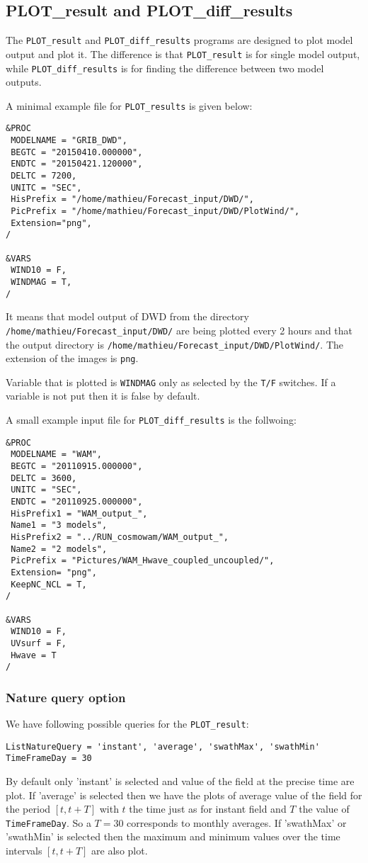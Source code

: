 \documentclass[12pt]{amsart}
\begin{document}
\subsection{PLOT\_result and PLOT\_diff\_results}

The {\tt PLOT\_result} and {\tt PLOT\_diff\_results} programs are designed to plot model output and plot it. The difference is that {\tt PLOT\_result} is for single model output, while {\tt PLOT\_diff\_results} is for finding the difference between two model outputs.

A minimal example file for {\tt PLOT\_results} is given below:
\begin{verbatim}
&PROC
 MODELNAME = "GRIB_DWD", 
 BEGTC = "20150410.000000",
 ENDTC = "20150421.120000",
 DELTC = 7200, 
 UNITC = "SEC", 
 HisPrefix = "/home/mathieu/Forecast_input/DWD/", 
 PicPrefix = "/home/mathieu/Forecast_input/DWD/PlotWind/", 
 Extension="png",
/

&VARS
 WIND10 = F, 
 WINDMAG = T, 
/
\end{verbatim}
It means that model output of DWD from the directory {\tt /home/mathieu/Forecast\_input/DWD/} are being plotted every 2 hours and that the output directory is {\tt /home/mathieu/Forecast\_input/DWD/PlotWind/}. The extension of the images is {\tt png}.

Variable that is plotted is {\tt WINDMAG} only as selected by the {\tt T/F} switches. If a variable is not put then it is false by default.

A small example input file for {\tt PLOT\_diff\_results} is the follwoing:
\begin{verbatim}
&PROC
 MODELNAME = "WAM", 
 BEGTC = "20110915.000000", 
 DELTC = 3600, 
 UNITC = "SEC", 
 ENDTC = "20110925.000000", 
 HisPrefix1 = "WAM_output_", 
 Name1 = "3 models",
 HisPrefix2 = "../RUN_cosmowam/WAM_output_", 
 Name2 = "2 models",
 PicPrefix = "Pictures/WAM_Hwave_coupled_uncoupled/",
 Extension= "png",
 KeepNC_NCL = T,
/

&VARS
 WIND10 = F, 
 UVsurf = F, 
 Hwave = T
/
\end{verbatim}


\subsubsection{Nature query option}
We have following possible queries for the {\tt PLOT\_result}:
\begin{verbatim}
ListNatureQuery = 'instant', 'average', 'swathMax', 'swathMin'
TimeFrameDay = 30
\end{verbatim}
By default only 'instant' is selected and value of the field at the precise time are plot.
If 'average' is selected then we have the plots of average value of the field for the period $[t, t+ T]$ with $t$ the time just as for instant field and $T$ the value of {\tt TimeFrameDay}. So a $T=30$ corresponds to monthly averages.
If 'swathMax' or 'swathMin' is selected then the maximum and minimum values over the time intervals $[t, t+T]$ are also plot.
\end{document}
